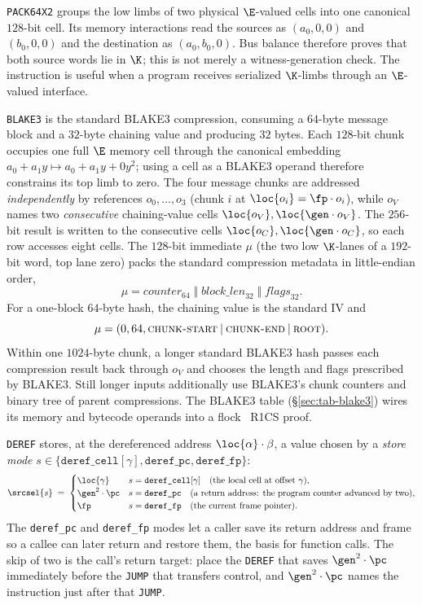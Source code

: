 \texttt{PACK64X2} groups the low limbs of two physical $\E$-valued cells into one canonical $128$-bit cell. Its memory interactions read the sources as $(a_0,0,0)$ and $(b_0,0,0)$ and the destination as $(a_0,b_0,0)$. Bus balance therefore proves that both source words lie in $\K$; this is not merely a witness-generation check. The instruction is useful when a program receives serialized $\K$-limbs through an $\E$-valued interface.

\texttt{BLAKE3} is the standard BLAKE3 compression, consuming a $64$-byte message block and a $32$-byte chaining value and producing $32$ bytes. Each $128$-bit chunk occupies one full $\E$ memory cell through the canonical embedding $a_0+a_1y\mapsto a_0+a_1y+0y^2$; using a cell as a BLAKE3 operand therefore constrains its top limb to zero. The four message chunks are addressed \emph{independently} by references $o_0,\dots,o_3$ (chunk $i$ at $\loc{o_i}=\fp\cdot o_i$), while $o_V$ names two \emph{consecutive} chaining-value cells $\loc{o_V},\loc{\gen\cdot o_V}$. The $256$-bit result is written to the consecutive cells $\loc{o_C},\loc{\gen\cdot o_C}$, so each row accesses eight cells. The $128$-bit immediate $\mu$ (the two low $\K$-lanes of a $192$-bit word, top lane zero) packs the standard compression metadata in little-endian order,
\[
  \mu=\mathit{counter}_{64}\;\Vert\;\mathit{block\_len}_{32}\;\Vert\;\mathit{flags}_{32}.
\]
For a one-block $64$-byte hash, the chaining value is the standard IV and
\[
  \mu=(0,64,\textsc{chunk-start}\mathbin{|}\textsc{chunk-end}\mathbin{|}\textsc{root}).
\]
Within one $1024$-byte chunk, a longer standard BLAKE3 hash passes each compression result back through $o_V$ and chooses the length and flags prescribed by BLAKE3. Still longer inputs additionally use BLAKE3's chunk counters and binary tree of parent compressions. The BLAKE3 table (\S\ref{sec:tab-blake3}) wires its memory and bytecode operands into a flock~\cite{flock-impl} R1CS proof.

\texttt{DEREF} stores, at the dereferenced address $\loc{\alpha}\cdot\beta$, a value chosen by a \emph{store mode} $s\in\{\texttt{deref\_cell}[\gamma],\texttt{deref\_pc},\texttt{deref\_fp}\}$:
\[
  \srcsel{s}\;=\;
  \begin{cases}
    \loc{\gamma} & s=\texttt{deref\_cell}[\gamma] \quad(\text{the local cell at offset }\gamma),\\
    \gen^{2}\cdot\pc & s=\texttt{deref\_pc} \quad(\text{a return address: the program counter advanced by two}),\\
    \fp & s=\texttt{deref\_fp} \quad(\text{the current frame pointer}).
  \end{cases}
\]
The \texttt{deref\_pc} and \texttt{deref\_fp} modes let a caller save its return address and frame so a callee can later return and restore them, the basis for function calls. The skip of two is the call's return target: place the \texttt{DEREF} that saves $\gen^{2}\cdot\pc$ immediately before the \texttt{JUMP} that transfers control, and $\gen^{2}\cdot\pc$ names the instruction just after that \texttt{JUMP}.


